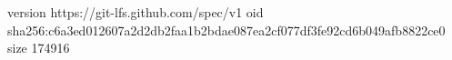 version https://git-lfs.github.com/spec/v1
oid sha256:c6a3ed012607a2d2db2faa1b2bdae087ea2cf077df3fe92cd6b049afb8822ce0
size 174916
